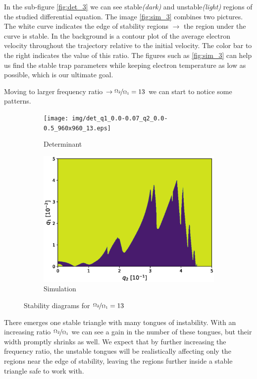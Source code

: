 In the sub-figure \ref{fig:det_3} we can see stable\textit{(dark)} and unstable\textit{(light)} regions of the studied differential equation. The image \ref{fig:sim_3} combines two pictures. The white curve indicates the edge of stability regions $\rightarrow$ the region under the curve is stable. In the background is a contour plot of the average electron velocity throughout the trajectory relative to the initial velocity. The color bar to the right indicates the value of this ratio. The figures such as \ref{fig:sim_3} can help us find the stable trap parameters while keeping electron temperature as low as possible, which is our ultimate goal.

Moving to larger frequency ratio $\rightarrow \nicefrac{\Omega_2}{\Omega_1} = 13$ we can start to notice some patterns.

\begin{figure}[H]
\begin{subfigure}{.5\textwidth}
  \centering
  \texttt{[image: img/det\_q1\_0.0-0.07\_q2\_0.0-0.5\_960x960\_13.eps]}
  \caption{Determinant}
  \label{fig:det_13}
\end{subfigure}%
\begin{subfigure}{.5\textwidth}
  \centering
  \includegraphics[width=\linewidth]{img/0_ions_1_electrons_q1_0.0-0.05_q2_0.0-0.5_640x640_13.eps}  
  \caption{Simulation}
  \label{fig:sim_13}
\end{subfigure}
\caption{Stability diagrams for $\nicefrac{\Omega_2}{\Omega_1} = 13$}
\label{fig:stabil-eta=13}
\end{figure}

There emerges one stable triangle with many tongues of instability. With an increasing ratio $\nicefrac{\Omega_2}{\Omega_1}$ we can see a gain in the number of these tongues, but their width promptly shrinks as well. We expect that by further increasing the frequency ratio, the unstable tongues will be realistically affecting only the regions near the edge of stability, leaving the regions further inside a stable triangle safe to work with.

